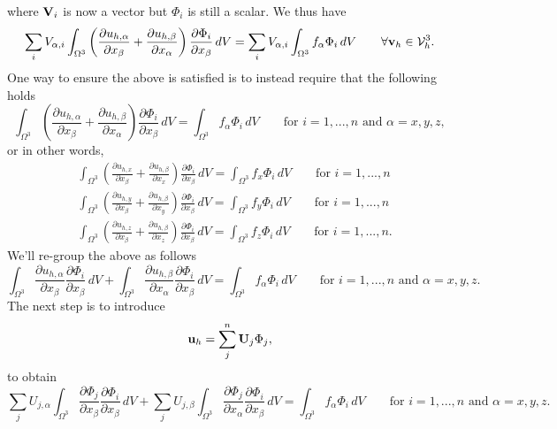 \documentclass[oneside,a4paper,11pt]{report}
\begin{document}
where $\mathbf{V}_i$ is now a vector but $\Phi_i$ is still a scalar. We thus have
\begin{equation}
    \sum_i V_{\alpha,i} \int_{\Omega^3}  \left ( \frac{\partial u_{h,\alpha}}{\partial x_\beta} + \frac{\partial u_{h,\beta}}{\partial x_\alpha} \right ) \frac{\partial \Phi_i}{\partial x_\beta} \, dV = \sum_i V_{\alpha,i} \int_{\Omega^3} f_\alpha \Phi_i \,dV \qquad \forall \mathbf{v}_h \in \mathcal{V}_h^3.
\end{equation}
One way to ensure the above is satisfied is to instead require that the following holds
\begin{equation}
    \int_{\Omega^3}  \left ( \frac{\partial u_{h,\alpha}}{\partial x_\beta} + \frac{\partial u_{h,\beta}}{\partial x_\alpha} \right ) \frac{\partial \Phi_i}{\partial x_\beta} \, dV = \int_{\Omega^3} f_\alpha \Phi_i \,dV \qquad \text{for } i = 1,...,n \text{ and } \alpha = x,y,z, 
\end{equation}
or in other words,
\begin{align}
    & \int_{\Omega^3}  \left ( \frac{\partial u_{h,x}}{\partial x_\beta} + \frac{\partial u_{h,\beta}}{\partial x_x} \right ) \frac{\partial \Phi_i}{\partial x_\beta} \, dV = \int_{\Omega^3} f_x \Phi_i \,dV \qquad \text{for } i = 1,...,n \nonumber \\ 
    & \int_{\Omega^3}  \left ( \frac{\partial u_{h,y}}{\partial x_\beta} + \frac{\partial u_{h,\beta}}{\partial x_y} \right ) \frac{\partial \Phi_i}{\partial x_\beta} \, dV = \int_{\Omega^3} f_y \Phi_i \,dV \qquad \text{for } i = 1,...,n \nonumber \\
    & \int_{\Omega^3}  \left ( \frac{\partial u_{h,z}}{\partial x_\beta} + \frac{\partial u_{h,\beta}}{\partial x_z} \right ) \frac{\partial \Phi_i}{\partial x_\beta} \, dV = \int_{\Omega^3} f_z \Phi_i \,dV \qquad \text{for } i = 1,...,n.
\end{align}
We'll re-group the above as follows
\begin{equation}
    \int_{\Omega^3} \frac{\partial u_{h,\alpha}}{\partial x_\beta} \frac{\partial \Phi_i}{\partial x_\beta} \,dV + \int_{\Omega^3} \frac{\partial u_{h,\beta}}{\partial x_\alpha} \frac{\partial \Phi_i}{\partial x_\beta} \, dV = \int_{\Omega^3} f_\alpha \Phi_i \,dV \qquad \text{for } i = 1,...,n \text{ and } \alpha = x,y,z.
\end{equation}
The next step is to introduce 
\begin{equation}
    \mathbf{u}_h = \sum_j^n \mathbf{U}_j \Phi_j,
\end{equation}
to obtain
\begin{equation}
    \sum_j U_{j,\alpha} \int_{\Omega^3} \frac{\partial \Phi_j}{\partial x_\beta} \frac{\partial \Phi_i}{\partial x_\beta} \,dV + \sum_j U_{j,\beta} \int_{\Omega^3} \frac{\partial \Phi_j}{\partial x_\alpha} \frac{\partial \Phi_i}{\partial x_\beta} \, dV = \int_{\Omega^3} f_\alpha \Phi_i \,dV \qquad \text{for } i = 1,...,n \text{ and } \alpha = x,y,z.
\end{equation}
\end{document}
